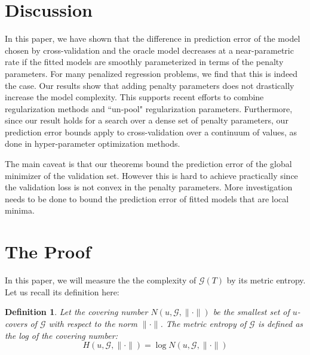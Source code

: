 \documentclass[12pt]{article}
\newtheorem{definition}{Definition}
\begin{document}
\section{Discussion}\label{sec:discussion}

In this paper, we have shown that the difference in prediction error of the model chosen by cross-validation and the oracle model decreases at a near-parametric rate if the fitted models are smoothly parameterized in terms of the penalty parameters. For many penalized regression problems, we find that this is indeed the case. Our results show that adding penalty parameters does not drastically increase the model complexity. This supports recent efforts to combine regularization methods and ``un-pool" regularization parameters. Furthermore, since our result holds for a search over a dense set of penalty parameters, our prediction error bounds apply to cross-validation over a continuum of values, as done in hyper-parameter optimization methods.

The main caveat is that our theorems bound the prediction error of the global minimizer of the validation set. However this is hard to achieve practically since the validation loss is not convex in the penalty parameters. More investigation needs to be done to bound the prediction error of fitted models that are local minima.

\section{The Proof} \label{sec:proofs}

In this paper, we will measure the the complexity of $\mathcal{G}(T)$ by its metric entropy. Let us recall its definition here:

\begin{definition}
Let the covering number $N(u, \mathcal{G}, \| \cdot \|)$ be the smallest set of $u$-covers of $\mathcal{G}$ with respect to the norm $\| \cdot \|$. The metric entropy of $\mathcal{G}$ is defined as the log of the covering number:
\begin{equation}
H (u, \mathcal{G}, \| \cdot \| ) = \log N(u, \mathcal{G}, \| \cdot \|)
\end{equation}
\end{definition}
\end{document}
